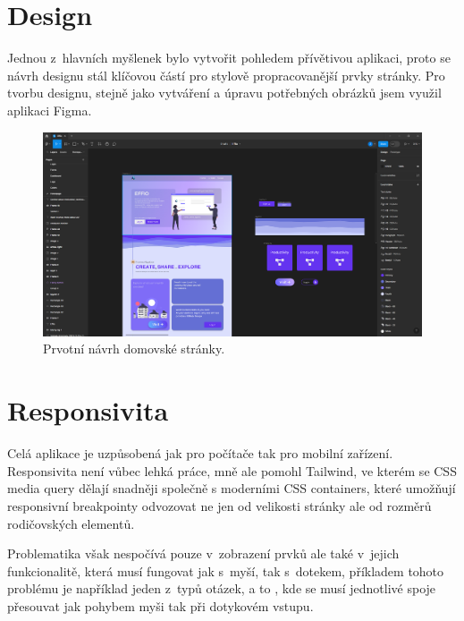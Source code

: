 \documentclass[12pt, a4paper,
openright
]{report}
\begin{document}
\section{Design}
Jednou z~hlavních myšlenek bylo vytvořit pohledem přívětivou aplikaci, proto se návrh designu stál klíčovou částí pro stylově propracovanější prvky stránky. Pro tvorbu designu, stejně jako vytváření a úpravu potřebných obrázků jsem využil aplikaci Figma.
\begin{figure}[h]
	\centering %
	\includegraphics[width=1\linewidth]{image/figma.png} 
	\caption{Prvotní návrh domovské stránky.} %
	\label{fig:figma} %
\end{figure}

\section{Responsivita}
Celá aplikace je uzpůsobená jak pro počítače tak pro mobilní zařízení. Responsivita není vůbec lehká práce, mně ale pomohl Tailwind, ve kterém se CSS media query dělají snadněji společně s moderními CSS containers, které umožňují responsivní breakpointy odvozovat ne jen od velikosti stránky ale od rozměrů rodičovských elementů.

Problematika však nespočívá pouze v~zobrazení prvků ale také v~jejich funkcionalitě, která musí fungovat jak s~myší, tak s~dotekem, příkladem tohoto problému je například jeden z~typů otázek, a to , kde se musí jednotlivé spoje přesouvat jak pohybem myši tak při dotykovém vstupu.
\end{document}
